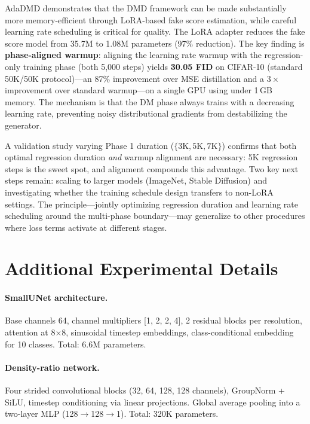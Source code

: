 \documentclass{article}
\theoremstyle{plain}
\theoremstyle{remark}
\begin{document}
AdaDMD demonstrates that the DMD framework can be made substantially more memory-efficient through LoRA-based fake score estimation, while careful learning rate scheduling is critical for quality. The LoRA adapter reduces the fake score model from 35.7M to 1.08M parameters (97\% reduction). The key finding is \textbf{phase-aligned warmup}: aligning the learning rate warmup with the regression-only training phase (both 5,000 steps) yields \textbf{30.05 FID} on CIFAR-10 (standard 50K/50K protocol)---an 87\% improvement over MSE distillation and a $3{\times}$ improvement over standard warmup---on a single GPU using under 1\,GB memory. The mechanism is that the DM phase always trains with a decreasing learning rate, preventing noisy distributional gradients from destabilizing the generator.

A validation study varying Phase 1 duration ($\{3\text{K}, 5\text{K}, 7\text{K}\}$) confirms that both optimal regression duration \emph{and} warmup alignment are necessary: 5K regression steps is the sweet spot, and alignment compounds this advantage. Two key next steps remain: scaling to larger models (ImageNet, Stable Diffusion) and investigating whether the training schedule design transfers to non-LoRA settings. The principle---jointly optimizing regression duration and learning rate scheduling around the multi-phase boundary---may generalize to other procedures where loss terms activate at different stages.




\appendix
\section{Additional Experimental Details}
\label{app:details}

\paragraph{SmallUNet architecture.}
Base channels 64, channel multipliers [1, 2, 2, 4], 2 residual blocks per resolution, attention at 8$\times$8, sinusoidal timestep embeddings, class-conditional embedding for 10 classes. Total: 6.6M parameters.

\paragraph{Density-ratio network.}
Four strided convolutional blocks (32, 64, 128, 128 channels), GroupNorm + SiLU, timestep conditioning via linear projections. Global average pooling into a two-layer MLP (128$\to$128$\to$1). Total: 320K parameters.
\end{document}
